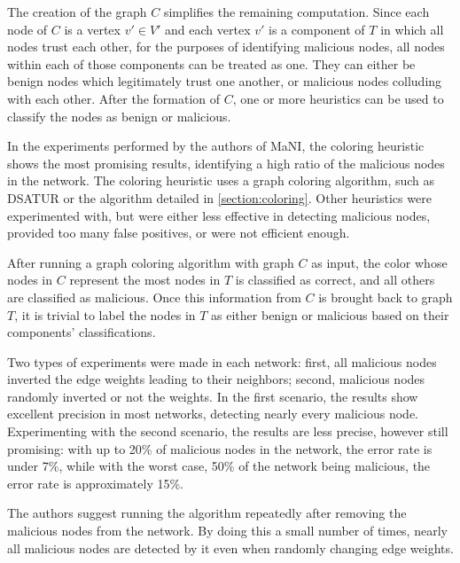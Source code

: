 The creation of the graph $C$ simplifies the remaining computation.
Since each node of $C$ is a vertex $v' \in V'$ and each vertex $v'$ is a component of $T$ in which all nodes trust each other, for the purposes of identifying malicious nodes, all nodes within each of those components can be treated as one.
They can either be benign nodes which legitimately trust one another, or malicious nodes colluding with each other.
After the formation of $C$, one or more heuristics can be used to classify the nodes as benign or malicious.

In the experiments performed by the authors of MaNI, the coloring heuristic shows the most promising results, identifying a high ratio of the malicious nodes in the network.
The coloring heuristic uses a graph coloring algorithm, such as DSATUR \citep{brelaz1979new} or the algorithm detailed in \autoref{section:coloring}.
Other heuristics were experimented with, but were either less effective in detecting malicious nodes, provided too many false positives, or were not efficient enough.

After running a graph coloring algorithm with graph $C$ as input, the color whose nodes in $C$ represent the most nodes in $T$ is classified as correct, and all others are classified as malicious.
Once this information from $C$ is brought back to graph $T$, it is trivial to label the nodes in $T$ as either benign or malicious based on their components' classifications.

Two types of experiments were made in each network: first, all malicious nodes inverted the edge weights leading to their neighbors; second, malicious nodes randomly inverted or not the weights.
In the first scenario, the results show excellent precision in most networks, detecting nearly every malicious node.
Experimenting with the second scenario, the results are less precise, however still promising: with up to 20\% of malicious nodes in the network, the error rate is under 7\%, while with the worst case, 50\% of the network being malicious, the error rate is approximately 15\%.

The authors suggest running the algorithm repeatedly after removing the malicious nodes from the network.
By doing this a small number of times, nearly all malicious nodes are detected by it even when randomly changing edge weights.

%
%
%


